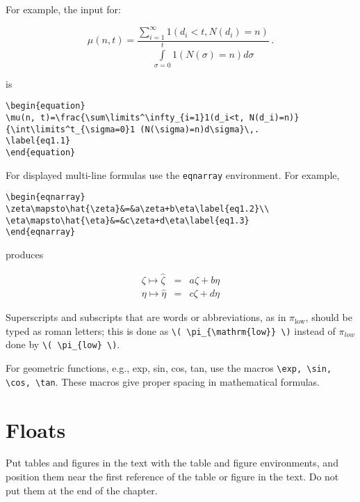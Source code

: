 For example, the input for:

\begin{equation}
\mu(n, t) = \frac{\sum\limits^\infty_{i=1}1 (d_i < t, N(d_i) = n)}
{\int\limits^t_{\sigma=0}1(N(\sigma)=n)d\sigma}\,. \label{eq1.1}
\end{equation}

\noindent is

\begin{verbatim}
\begin{equation}
\mu(n, t)=\frac{\sum\limits^\infty_{i=1}1(d_i<t, N(d_i)=n)}
{\int\limits^t_{\sigma=0}1 (N(\sigma)=n)d\sigma}\,.
\label{eq1.1}
\end{equation}
\end{verbatim}

For displayed multi-line formulas use the \verb|eqnarray| environment. For
example,

\begin{verbatim}
\begin{eqnarray}
\zeta\mapsto\hat{\zeta}&=&a\zeta+b\eta\label{eq1.2}\\
\eta\mapsto\hat{\eta}&=&c\zeta+d\eta\label{eq1.3}
\end{eqnarray}
\end{verbatim}

\noindent produces

\noindent\begin{eqnarray}
\zeta\mapsto\hat{\zeta}&=&a\zeta+b\eta\label{eq1.2}\\
\eta\mapsto\hat{\eta}&=&c\zeta+d\eta\label{eq1.3}
\end{eqnarray}

Superscripts and subscripts that are words or abbreviations, as in
\( \pi_{\mathrm{low}} \), should be typed as roman letters; this is
done as \verb|\( \pi_{\mathrm{low}} \)| instead of \( \pi_{low} \)
done by \verb|\( \pi_{low} \)|.

For geometric functions, e.g., exp, sin, cos, tan, use
the macros \verb|\exp, \sin, \cos, \tan|. These macros give proper
spacing in mathematical formulas.

\section{Floats}
Put tables and figures in the text with the table and figure
environments, and position them near the first reference of the
table or figure in the text. Do not put them at the end of the
chapter.

